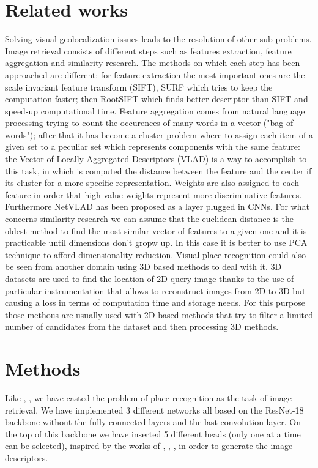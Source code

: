 \documentclass[10pt,twocolumn,letterpaper]{article}
\begin{document}
\section{Related works}
	Solving visual geolocalization issues leads to the resolution of other sub-problems.
	\newline Image retrieval consists of different steps such as features extraction, feature aggregation and similarity research.
	The methods on which each step has been approached are different: for feature extraction the most important ones are
	the scale invariant feature transform (SIFT), SURF which tries to keep the computation faster;
	then RootSIFT which finds better descriptor than SIFT and speed-up computational time.
	\newline Feature aggregation comes from natural language processing trying to count the occurences of many words in a vector ("bag of words");
	after that it has become a cluster problem where to assign each item of a given set to a peculiar set which represents 
	components with the same feature: the Vector of Locally Aggregated Descriptors (VLAD) is a way to accomplish to this task, in which
	is computed the distance between the feature and the center if its cluster for a more specific representation.
	Weights are also assigned to each feature in order that high-value weights represent more discriminative features.
	Furthermore NetVLAD \cite{NETVLAD} has been proposed as a layer plugged in CNNs.
	\newline For what concerns similarity research we can assume that the euclidean distance is the oldest method to find the most similar
	vector of features to a given one and it is practicable until dimensions don't gropw up. In this case it is better to use PCA technique
	to afford dimensionality reduction.
	\newline Visual place recognition could also be seen from another domain using 3D based methods to deal with it. 3D datasets are used to find
	the location of 2D query image thanks to the use of particular instrumentation that allows to reconstruct images from 2D to 3D but
	causing a loss in terms of computation time and storage needs. For this purpose those methous are usually used with 2D-based methods
	that try to filter a limited number of candidates from the dataset and then processing 3D methods.

\section{Methods}
Like \cite{GEM}, \cite{NETVLAD}, \cite{CRN} we have casted the problem of place recognition as the task of image
retrieval. We have implemented 3 different networks all based on the ResNet-18 \cite{resnet} backbone
without the fully connected layers and the last convolution layer. On the top of this backbone we 
have inserted 5 different heads (only one at a time can be selected), inspired by the works of \cite{GEM}, \cite{NETVLAD}, \cite{CRN}, in order
to generate the image descriptors. 
\end{document}
